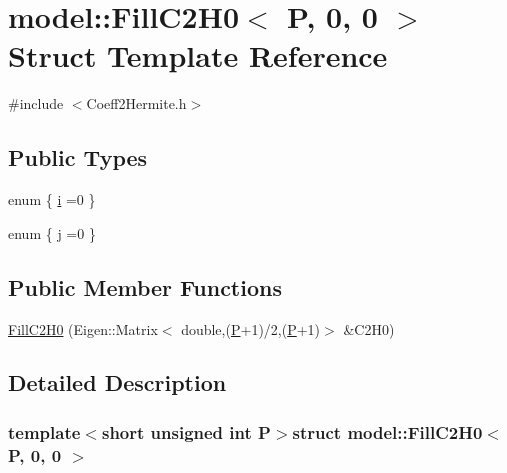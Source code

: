 \hypertarget{structmodel_1_1_fill_c2_h0_3_01_p_00_010_00_010_01_4}{}\section{model\+:\+:Fill\+C2\+H0$<$ P, 0, 0 $>$ Struct Template Reference}
\label{structmodel_1_1_fill_c2_h0_3_01_p_00_010_00_010_01_4}


{\ttfamily \#include $<$Coeff2\+Hermite.\+h$>$}

\subsection*{Public Types}
\begin{DoxyCompactItemize}
\item 
enum \{ \hyperlink{structmodel_1_1_fill_c2_h0_3_01_p_00_010_00_010_01_4_a73f64d71a171d8109cb181cc595154dba52a096241b64af7ea48a3f98ceb73b4b}{i} =0
 \}
\item 
enum \{ \hyperlink{structmodel_1_1_fill_c2_h0_3_01_p_00_010_00_010_01_4_a1c6c0c645f5c6bd31e269bae9bb1f824a793e0c28e1a6a59fbc412d9045d88e64}{j} =0
 \}
\end{DoxyCompactItemize}
\subsection*{Public Member Functions}
\begin{DoxyCompactItemize}
\item 
\hyperlink{structmodel_1_1_fill_c2_h0_3_01_p_00_010_00_010_01_4_a3fb64aec1009759081a927b0a47b132c}{Fill\+C2\+H0} (Eigen\+::\+Matrix$<$ double,(\hyperlink{_f_e_m_2linear__elasticity__3d_2tetgen_2generate_p_o_l_ycube_8m_a50a9afb44201a65ab7ad5feb2150aeb6}{P}+1)/2,(\hyperlink{_f_e_m_2linear__elasticity__3d_2tetgen_2generate_p_o_l_ycube_8m_a50a9afb44201a65ab7ad5feb2150aeb6}{P}+1)$>$ \&C2\+H0)
\end{DoxyCompactItemize}


\subsection{Detailed Description}
\subsubsection*{template$<$short unsigned int P$>$struct model\+::\+Fill\+C2\+H0$<$ P, 0, 0 $>$}



